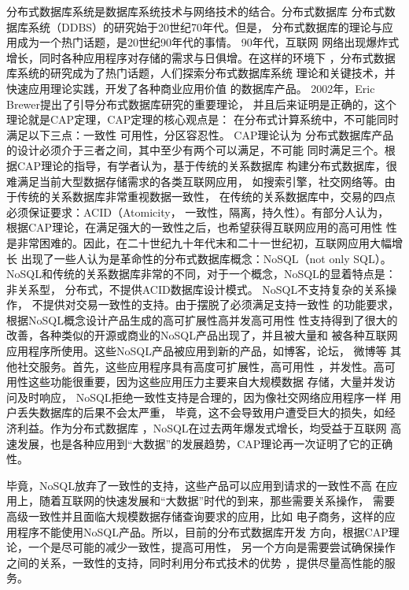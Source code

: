 分布式数据库系统是数据库系统技术与网络技术的结合。分布式数据库
分布式数据库系统（DDBS）的研究始于20世纪70年代。但是，
分布式数据库的理论与应用成为一个热门话题，是20世纪90年代的事情。
 90年代，互联网
网络出现爆炸式增长，同时各种应用程序对存储的需求与日俱增。在这样的环境下
，分布式数据库系统的研究成为了热门话题，人们探索分布式数据库系统
理论和关键技术，并快速应用理论实践，开发了各种商业应用价值
的数据库产品。 2002年，Eric Brewer提出了引导分布式数据库研究的重要理论，
并且后来证明是正确的，这个理论就是CAP定理，CAP定理的核心观点是：
在分布式计算系统中，不可能同时满足以下三点：一致性
可用性，分区容忍性。 CAP理论认为
分布式数据库产品的设计必须介于三者之间，其中至少有两个可以满足，不可能
同时满足三个。根据CAP理论的指导，有学者认为，基于传统的关系数据库
构建分布式数据库，很难满足当前大型数据存储需求的各类互联网应用，
如搜索引擎，社交网络等。由于传统的关系数据库非常重视数据一致性，
在传统的关系数据库中，交易的四点必须保证要求：ACID（Atomicity，
一致性，隔离，持久性）。有部分人认为，
根据CAP理论，在满足强大的一致性之后，也希望获得互联网应用的高可用性
性是非常困难的。因此，在二十世纪九十年代末和二十一世纪初，互联网应用大幅增长
出现了一些人认为是革命性的分布式数据库概念：NoSQL（not only SQL）。
NoSQL和传统的关系数据库非常的不同，对于一个概念，NoSQL的显着特点是：
非关系型，
分布式，不提供ACID数据库设计模式。 NoSQL不支持复杂的关系操作，
不提供对交易一致性的支持。由于摆脱了必须满足支持一致性
的功能要求，根据NoSQL概念设计产品生成的高可扩展性高并发高可用性
性支持得到了很大的改善，各种类似的开源或商业的NoSQL产品出现了，并且被大量和
被各种互联网应用程序所使用。这些NoSQL产品被应用到新的产品，如博客，论坛，
微博等
其他社交服务。首先，这些应用程序具有高度可扩展性，高可用性
，并发性。高可用性这些功能很重要，因为这些应用压力主要来自大规模数据
存储，大量并发访问及时响应，
NoSQL拒绝一致性支持是合理的，因为像社交网络应用程序一样
用户丢失数据库的后果不会太严重，
毕竟，这不会导致用户遭受巨大的损失，如经济利益。作为分布式数据库
，NoSQL在过去两年爆发式增长，均受益于互联网
高速发展，也是各种应用到“大数据”的发展趋势，CAP理论再一次证明了它的正确性。

毕竟，NoSQL放弃了一致性的支持，这些产品可以应用到请求的一致性不高
在应用上，随着互联网的快速发展和“大数据”时代的到来，那些需要关系操作，
需要高级一致性并且面临大规模数据存储查询要求的应用，比如
电子商务，这样的应用程序不能使用NoSQL产品。所以，目前的分布式数据库开发
方向，根据CAP理论，一个是尽可能的减少一致性，提高可用性，
另一个方向是需要尝试确保操作之间的关系，一致性的支持，同时利用分布式技术的优势
，提供尽量高性能的服务。
